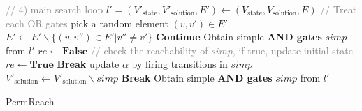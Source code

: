 \documentclass[runningheads]{llncs}
\begin{document}
\begin{algorithm}[ht]
\begin{algorithmic}
\State \textcolor{gray}{// 4) main search loop} \label{main_loop_begin}
    \State $l'=(V'_{\mathrm{state}}, V'_{\mathrm{solution}},E')\gets(V_{\mathrm{state}}, V_{\mathrm{solution}},E)$
     \textcolor{gray}{// Treat each OR gates}
        \State pick a random element $(v,v') \in E'$
        \State $E'\gets E' \backslash  \{(v,v'') \in E'| v''\neq v'\}$
    \EndFor
        \State \textbf{Continue}
    \EndIf
    \State Obtain simple \textbf{AND gates} $simp$ from $l'$
        \State $re\gets\mathbf{False}$ \textcolor{gray}{// check the reachability of $simp$, if true, update initial state}
                \State $re\gets\mathbf{True}$
                \State \textbf{Break}
            \EndIf
        \EndFor
            \State update $\alpha$ by firing transitions in $simp$
            \State $V'_{\mathrm{solution}}\gets V'_{\mathrm{solution}} \backslash simp$
        \Else
            \State \textbf{Break}
        \EndIf
        \State Obtain simple \textbf{AND gates} $simp$ from $l'$
    \EndWhile
    \EndIf
\EndFor \label{main_loop_end}
\State {}
\end{algorithmic}
\caption{PermReach}\label{algOverall}
\end{algorithm}
\end{document}
